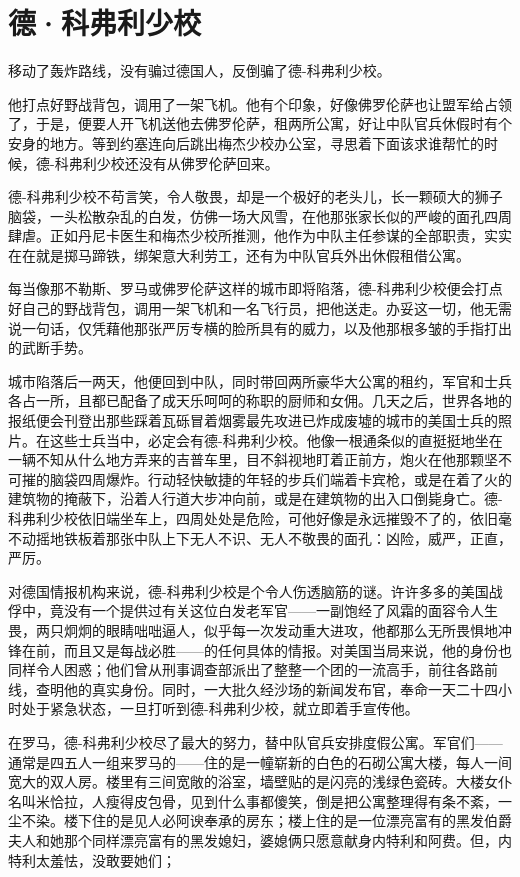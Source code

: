 \chapter{德·科弗利少校}
 
    移动了轰炸路线，没有骗过德国人，反倒骗了德-科弗利少校。

    他打点好野战背包，调用了一架飞机。他有个印象，好像佛罗伦萨也让盟军给占领了，于是，便要人开飞机送他去佛罗伦萨，租两所公寓，好让中队官兵休假时有个安身的地方。等到约塞连向后跳出梅杰少校办公室，寻思着下面该求谁帮忙的时候，德-科弗利少校还没有从佛罗伦萨回来。

    德-科弗利少校不苟言笑，令人敬畏，却是一个极好的老头儿，长一颗硕大的狮子脑袋，一头松散杂乱的白发，仿佛一场大风雪，在他那张家长似的严峻的面孔四周肆虐。正如丹尼卡医生和梅杰少校所推测，他作为中队主任参谋的全部职责，实实在在就是掷马蹄铁，绑架意大利劳工，还有为中队官兵外出休假租借公寓。

    每当像那不勒斯、罗马或佛罗伦萨这样的城市即将陷落，德-科弗利少校便会打点好自己的野战背包，调用一架飞机和一名飞行员，把他送走。办妥这一切，他无需说一句话，仅凭藉他那张严厉专横的脸所具有的威力，以及他那根多皱的手指打出的武断手势。

    城市陷落后一两天，他便回到中队，同时带回两所豪华大公寓的租约，军官和士兵各占一所，且都已配备了成天乐呵呵的称职的厨师和女佣。几天之后，世界各地的报纸便会刊登出那些踩着瓦砾冒着烟雾最先攻进已炸成废墟的城市的美国士兵的照片。在这些士兵当中，必定会有德-科弗利少校。他像一根通条似的直挺挺地坐在一辆不知从什么地方弄来的吉普车里，目不斜视地盯着正前方，炮火在他那颗坚不可摧的脑袋四周爆炸。行动轻快敏捷的年轻的步兵们端着卡宾枪，或是在着了火的建筑物的掩蔽下，沿着人行道大步冲向前，或是在建筑物的出入口倒毙身亡。德-科弗利少校依旧端坐车上，四周处处是危险，可他好像是永远摧毁不了的，依旧毫不动摇地铁板着那张中队上下无人不识、无人不敬畏的面孔：凶险，威严，正直，严厉。

    对德国情报机构来说，德-科弗利少校是个令人伤透脑筋的谜。许许多多的美国战俘中，竟没有一个提供过有关这位白发老军官——一副饱经了风霜的面容令人生畏，两只炯炯的眼睛咄咄逼人，似乎每一次发动重大进攻，他都那么无所畏惧地冲锋在前，而且又是每战必胜——的任何具体的情报。对美国当局来说，他的身份也同样令人困惑；他们曾从刑事调查部派出了整整一个团的一流高手，前往各路前线，查明他的真实身份。同时，一大批久经沙场的新闻发布官，奉命一天二十四小时处于紧急状态，一旦打听到德-科弗利少校，就立即着手宣传他。

 


    在罗马，德-科弗利少校尽了最大的努力，替中队官兵安排度假公寓。军官们——通常是四五人一组来罗马的——住的是一幢崭新的白色的石砌公寓大楼，每人一间宽大的双人房。楼里有三间宽敞的浴室，墙壁贴的是闪亮的浅绿色瓷砖。大楼女仆名叫米恰拉，人瘦得皮包骨，见到什么事都傻笑，倒是把公寓整理得有条不紊，一尘不染。楼下住的是见人必阿谀奉承的房东；楼上住的是一位漂亮富有的黑发伯爵夫人和她那个同样漂亮富有的黑发媳妇，婆媳俩只愿意献身内特利和阿费。但，内特利太羞怯，没敢要她们；

